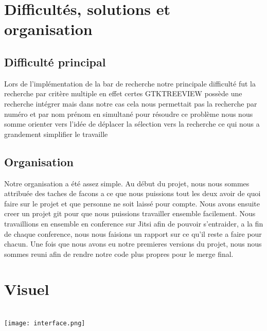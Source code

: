 \documentclass[a4paper, 11pt]{article}
\begin{document}
\newpage
\section{Difficultés, solutions et organisation}

\subsection{Difficulté principal} 
\begin{center}
 Lors de l’implémentation de la bar de recherche notre principale difficulté fut la recherche par critère multiple en effet certes GTKTREEVIEW possède une recherche intégrer mais dans notre cas cela nous permettait pas la recherche par numéro et par nom prénom en simultané pour résoudre ce problème nous nous somme orienter vers l'idée de déplacer la sélection vers la recherche ce qui nous a grandement simplifier le travaille

\end{center}

\subsection{Organisation} 
\begin{center}
  Notre organisation a été assez simple. Au début du projet, nous nous sommes attribuée des taches de facons a ce        que nous puissions tout les deux avoir de quoi faire sur le projet et que personne ne soit laissé pour compte. 
  Nous avons ensuite creer un projet git pour que nous puissions travailler ensemble facilement. Nous travaillions en ensemble en conference sur Jitsi afin de pouvoir s'entraider, a la fin de chaque conference,
  nous nous faisions un rapport sur ce qu'il reste a faire pour chacun. Une fois que nous avons eu notre premieres versions du projet, nous nous sommes reuni afin de rendre notre code plus propres pour le merge final.
\end{center}
\newpage
\section{Visuel} \\

\texttt{[image: interface.png]}
\end{document}

